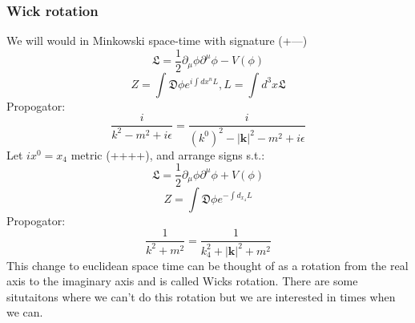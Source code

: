 \documentclass{article}
\begin{document}
\subsubsection{Wick rotation}
We will would in Minkowski space-time with signature (+---)
$$
\mathfrak{L} = \frac{1}{2} \partial_{\mu} \phi \partial^{\mu} \phi - V(\phi)
$$
$$
Z = \int \mathfrak{D}\phi e^{i \int dx^n L}, L = \int d^3 x \mathfrak{L}
$$
Propogator:
$$
\frac{i}{k^2 -m^2 + i \epsilon} = \frac{i}{(k^0)^2 - |\bm k|^2 - m^2 + i\epsilon}
$$
Let $ix^0 = x_4$ metric (++++), and arrange signs s.t.:
$$
\mathfrak{L} = \frac{1}{2} \partial_{\mu}\phi \partial^{\mu} \phi + V(\phi)
$$
$$
Z = \int \mathfrak{D}\phi e^{- \int d_{x_4} L}
$$
Propogator:
$$
\frac{1}{k^2 + m^2} = \frac{1}{k^2_4 + |\bm k|^2 + m^2}
$$
This change to euclidean space time can be thought of as a rotation from the real axis to the imaginary axis and is called Wicks rotation. There are some situtaitons where we can't do this rotation but we are interested in times when we can.\\\\
\end{document}

